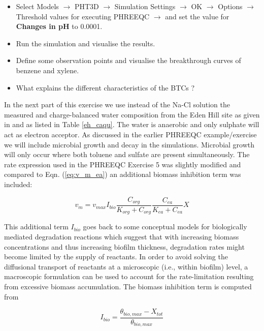 \begin{itemize}
\item Select Models $\rightarrow$ PHT3D $\rightarrow$ Simulation Settings 
$\rightarrow$ OK $\rightarrow$ Options $\rightarrow$ Threshold values for executing PHREEQC $\rightarrow$ and set the value for \textbf{Changes in pH} to 0.0001.

\item Run the simulation and visualise the results. 

\item Define some observation points and visualise the breakthrough curves
of benzene and xylene.

\item What explains the different characteristics of the BTCs ?

\end{itemize}

In the next part of this exercise we use instead of the Na-Cl solution
the measured and charge-balanced water composition from the Eden Hill site as given in \cite{prommer_jch} and as listed in Table \ref{eh_caqu}.
The water is anaerobic and only sulphate will act as electron acceptor. 
As discussed in the earlier PHREEQC example/exercise we will include 
microbial growth and decay in the simulations. Microbial growth
will only occur where both toluene and sulfate are present simultaneously.
The rate expression used in the PHREEQC Exercise 5 was slightly 
modified and compared to Eqn. (\ref{eq:v_m_ea}) an additional biomass 
inhibition term was included:

\begin{equation}
v_{m} = v_{max} I_{bio} \frac{C_{org}}{K_{org} + C_{org}} \frac{C_{ea}}{K_{ea} + C_{ea}} X
\end{equation}

This additional term $I_{bio}$ goes back to some conceptual models for biologically 
mediated degradation reactions which suggest that with increasing 
biomass concentrations and thus increasing biofilm thickness, 
degradation rates might become limited by the supply of reactants. 
In order to avoid solving the diffusional transport of reactants 
at a microscopic (i.e., within biofilm) level, a macroscopic formulation 
can be used to account for the rate-limitation resulting 
from excessive biomass accumulation. 
The biomass inhibition term is computed from

\begin{equation}
{ I_{bio} = \frac{\theta_{bio,max} - X_{tot}}{\theta_{bio,max}} }
\label{eq:lambda_diff}
\end{equation}
%

